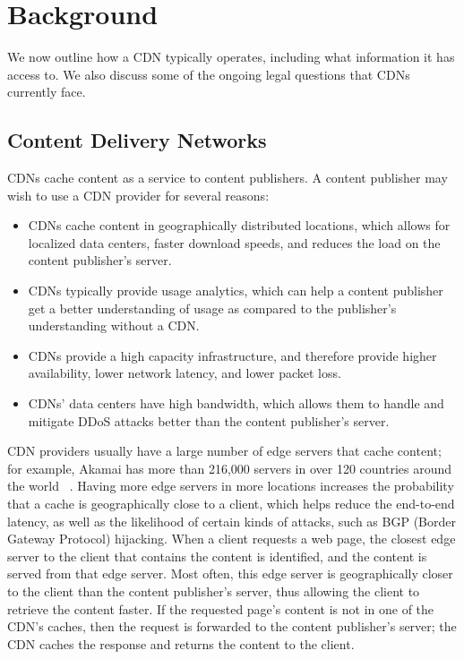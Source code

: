 \section{Background}
\label{sec:background}

We now outline how a CDN typically operates, including what information it
has access to. We also discuss some of the ongoing legal
questions that CDNs currently face.

\subsection{Content Delivery Networks}
CDNs cache content as a service to content publishers.  A 
content publisher may wish to use a CDN provider for several reasons:

\begin{itemize}
\item CDNs cache content in geographically distributed locations, which allows for localized data centers, faster download speeds, and reduces the load on the content publisher's server.
\item CDNs typically provide usage analytics, which can help a content publisher get a better understanding of usage as compared to the publisher's understanding without a CDN.
\item CDNs provide a high capacity infrastructure, and therefore provide higher availability, lower network latency, and lower packet loss.  
\item CDNs' data centers have high bandwidth, which allows them to handle and mitigate DDoS attacks better than the content publisher's server.
\end{itemize}

CDN providers usually have a large number of edge servers that cache content;
for example, Akamai has more than 216,000 servers in over 120 countries around
the world~ \cite{akamai_facts}.  Having more edge servers in more locations
increases the probability that a cache is geographically close to a client,
which helps reduce the end-to-end latency, as well as the likelihood of
certain kinds of attacks, such as BGP (Border Gateway Protocol) hijacking.
When a client requests a web page, the closest edge server to the client that
contains the content is identified, and the content is served from that edge
server.  Most often, this edge server is geographically closer to the client
than the content publisher's server, thus allowing the client to retrieve the
content faster. If the requested page's content is not in one of the CDN's
caches, then the request is forwarded to the content publisher's server; the
CDN caches the response and returns the content to the client.

